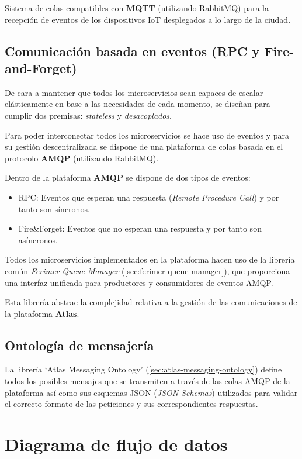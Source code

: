 Sistema de colas compatibles con \textbf{MQTT} (utilizando RabbitMQ) para la recepción de eventos de los dispositivos IoT desplegados a lo largo de la ciudad.

\subsection{Comunicación basada en eventos (RPC y Fire-and-Forget)}

De cara a mantener que todos los microservicios sean capaces de escalar elásticamente en base a las necesidades de cada momento, se diseñan para cumplir dos premisas: \textit{stateless} y \textit{desacoplados}.

Para poder interconectar todos los microservicios se hace uso de eventos y para su gestión descentralizada se dispone de una plataforma de colas basada en el protocolo \textbf{AMQP} (utilizando RabbitMQ).

Dentro de la plataforma \textbf{AMQP} se dispone de dos tipos de eventos:

\begin{itemize}
	\item RPC: Eventos que esperan una respuesta (\textit{Remote Procedure Call}) y por tanto son síncronos.
	\item Fire\&Forget: Eventos que no esperan una respuesta y por tanto son asíncronos.
\end{itemize}

Todos los microservicios implementados en la plataforma hacen uso de la librería común \textit{Ferimer Queue Manager} (\ref{sec:ferimer-queue-manager}), que proporciona una interfaz unificada para productores y consumidores de eventos AMQP.

Esta librería abstrae la complejidad relativa a la gestión de las comunicaciones de la plataforma \textbf{Atlas}.

\subsection{Ontología de mensajería}

La librería `Atlas Messaging Ontology' (\ref{sec:atlas-messaging-ontology}) define todos los posibles mensajes que se transmiten a través de las colas AMQP de la plataforma así como sus esquemas JSON (\textit{JSON Schemas}) utilizados para validar el correcto formato de las peticiones y sus correspondientes respuestas.

\section{Diagrama de flujo de datos}

